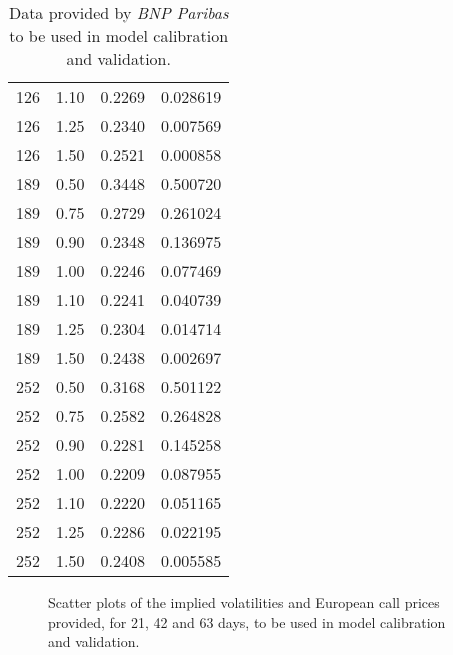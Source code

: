 \begin{table}[!htb]
\begin{adjustwidth}{0cm}{0cm}
\begin{subfigmatrix}{2}
{\begin{tabular}{@{}lccr@{}}
126 & 1.10 & 0.2269 & 0.028619 \\
126 & 1.25 & 0.2340 & 0.007569 \\
126 & 1.50 & 0.2521 & 0.000858 \\ \midrule
189 & 0.50 & 0.3448 & 0.500720 \\
189 & 0.75 & 0.2729 & 0.261024 \\
189 & 0.90 & 0.2348 & 0.136975 \\
189 & 1.00 & 0.2246 & 0.077469 \\
189 & 1.10 & 0.2241 & 0.040739 \\
189 & 1.25 & 0.2304 & 0.014714 \\
189 & 1.50 & 0.2438 & 0.002697 \\ \midrule
252 & 0.50 & 0.3168 & 0.501122 \\
252 & 0.75 & 0.2582 & 0.264828 \\
252 & 0.90 & 0.2281 & 0.145258 \\
252 & 1.00 & 0.2209 & 0.087955 \\
252 & 1.10 & 0.2220 & 0.051165 \\
252 & 1.25 & 0.2286 & 0.022195 \\
252 & 1.50 & 0.2408 & 0.005585 \\ \bottomrule
\end{tabular}
}
  \end{subfigmatrix}
  \caption[Data provided by \emph{BNP Paribas} to be used in model calibration and validation.]{Data provided by \emph{BNP Paribas} to be used in model calibration and validation.}
  \label{tab:mktdata}
  \end{adjustwidth}
\end{table}



\begin{figure}[!htb]
  \begin{subfigmatrix}{2}
  \end{subfigmatrix}
  \caption[Scatter plots of the implied volatilities and European call prices provided, for 21, 42 and 63 days, to be used in model calibration and validation.]{Scatter plots of the implied volatilities and European call prices provided, for 21, 42 and 63 days, to be used in model calibration and validation.}
  \label{fig:mktdata}
\end{figure}

